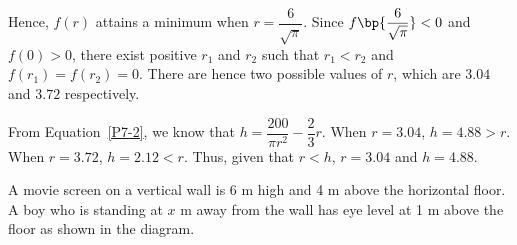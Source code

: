 \documentclass{echw}
\begin{document}
            Hence, $f(r)$ attains a minimum when $r = \dfrac6{\sqrt\pi}$. Since $f\bp{\dfrac6{\sqrt\pi}} < 0$ and $f(0) > 0$, there exist positive $r_1$ and  $r_2$ such that $r_1 < r_2$ and $f(r_1) = f(r_2) = 0$. There are hence two possible values of $r$, which are $3.04$ and $3.72$ respectively.

            From Equation~\ref{P7-2}, we know that $h= \dfrac{200}{\pi r^2} - \dfrac23 r$. When $r = 3.04$, $h = 4.88 > r$. When $r = 3.72$, $h = 2.12 < r$. Thus, given that $r < h$, $r = 3.04$ and $h = 4.88$.


    \problem{}
        \begin{center}
        \end{center}
        
        A movie screen on a vertical wall is 6 m high and 4 m above the horizontal floor. A boy who is standing at $x$ m away from the wall has eye level at 1 m above the floor as shown in the diagram.
\end{document}
